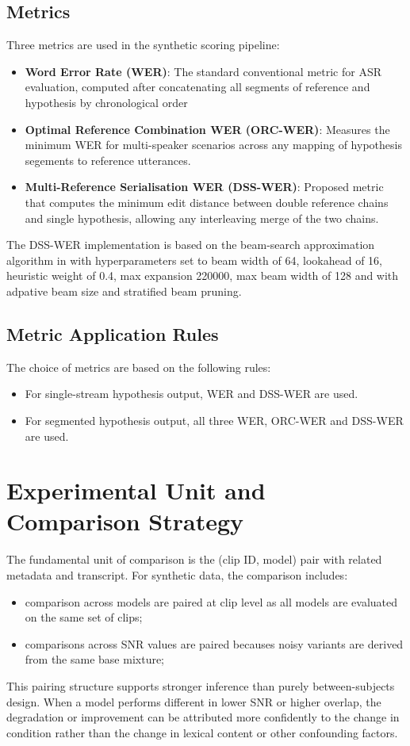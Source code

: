 \subsection{Metrics}
Three metrics are used in the synthetic scoring pipeline:
\begin{itemize}
    \item \textbf{Word Error Rate (WER)}: The standard conventional metric for ASR evaluation, computed after concatenating all segments of reference and hypothesis by chronological order
    \item \textbf{Optimal Reference Combination WER (ORC-WER)}: Measures the minimum WER for multi-speaker scenarios across any mapping of hypothesis segements to reference utterances.
    \item \textbf{Multi-Reference Serialisation WER (DSS-WER)}: Proposed metric that computes the minimum edit distance between double reference chains and single hypothesis, allowing any interleaving merge of the two chains.
\end{itemize}
The DSS-WER implementation is based on the beam-search approximation algorithm in  with hyperparameters set to beam width of 64, lookahead of 16, heuristic weight of 0.4, max expansion 220000, max beam width of 128 and with adpative beam size and stratified beam pruning.

\subsection{Metric Application Rules}
The choice of metrics are based on the following rules:
\begin{itemize}
    \item For single-stream hypothesis output, WER and DSS-WER are used.
    \item For segmented hypothesis output, all three WER, ORC-WER and DSS-WER are used.
\end{itemize}

\section{Experimental Unit and Comparison Strategy}
The fundamental unit of comparison is the (clip ID, model) pair with related metadata and transcript. For synthetic data, the comparison includes:
\begin{itemize}
    \item comparison across models are paired at clip level as all models are evaluated on the same set of clips;
    \item comparisons across SNR values are paired becauses noisy variants are derived from the same base mixture;
\end{itemize}
This pairing structure supports stronger inference than purely between-subjects design. When a model performs different in lower SNR or higher overlap, the degradation or improvement can be attributed more confidently to the change in condition rather than the change in lexical content or other confounding factors. 


